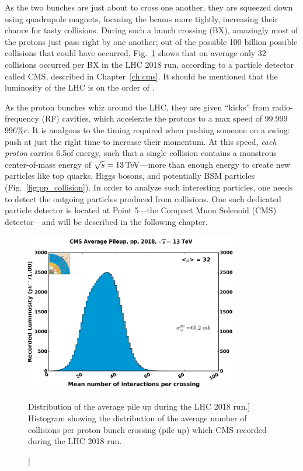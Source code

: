 As the two bunches are just about to cross one another, they are squeezed down using quadrupole magnets, focusing the beams more tightly, increasing their chance for tasty \pp collisions.
During such a bunch crossing (BX), amazingly most of the protons just pass right by one another; 
out of the possible 100 billion possible collisions that could have occurred, Fig.~\ref{plt:pileup} shows that on average only 32 collisions occurred per BX in the LHC 2018 run, according to a particle detector called CMS, described in Chapter~\ref{ch:cms}.
It should be mentioned that the luminosity of the LHC is on the order of \LHigh. %

As the proton bunches whiz around the LHC, they are given ``kicks'' from radio-frequency (RF) cavities, which accelerate the protons to a max speed of 99.999\,996\%$c$.
It is analgous to the timing required when pushing someone on a swing: push at just the right time to increase their momentum.
At this speed, \emph{each proton} carries 6.5\TeV of energy, such that a single \pp collision contains a monstrous center-of-mass energy of $\sqrt{s} = 13\,\text{Te\hspace{-.08em}V}$---more than enough energy to create new particles like top quarks, Higgs bosons, and potentially BSM particles
(Fig.~\ref{fig:pp_collision}).
In order to analyze such interesting particles, one needs to detect the outgoing particles produced from \pp collisions.
One such dedicated particle detector is located at Point 5---the Compact Muon Solenoid (CMS) detector---and will be described in the following chapter.
\begin{figure}[h]
    \centering
    \includegraphics[height=7cm,keepaspectratio]{figures/lhc/pileup_pp_2018.png}
        \caption
            [Distribution of the average pile up during the LHC 2018 run.]
            {Histogram showing the distribution of the average number of \pp collisions per proton bunch crossing (pile up) which CMS recorded during the LHC 2018 run.} 
        \label{plt:pileup}
    \end{figure}
